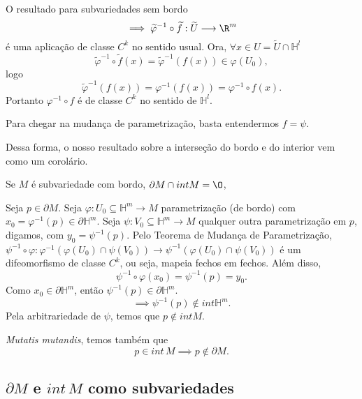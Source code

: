 \begin{demo}
    O resultado para subvariedades sem bordo \[
    \implies \widetilde{\varphi }^{-1} \circ \widetilde{f} : \widetilde{U} \longrightarrow \R^{m}
    \] é uma aplicação de classe $C^{k}$ no sentido usual. Ora, $\forall x\in U = \widetilde{U}\cap \mathbb{H}^{l}$ \[
    \widetilde{\varphi }^{-1} \circ \widetilde{f}\left( x \right)  = \widetilde{\varphi }^{-1}\left( f\left( x \right)  \right) \in \varphi \left( U_0 \right) 
    ,\] logo \[
    \widetilde{\varphi }^{-1}\left( f\left( x \right)  \right) = \varphi ^{-1}\left( f\left( x \right)  \right) = \varphi ^{-1}\circ f \left( x \right) 
    .\] Portanto $\varphi ^{-1}\circ f$ é de classe $C^{k}$ no sentido de $\mathbb{H}^{l}$.
\end{demo}

Para chegar na mudança de parametrização, basta entendermos $f = \psi$.

Dessa forma, o nosso resultado sobre a interseção do bordo e do interior vem como um corolário.

\begin{corollary}
    Se $M$ é subvariedade com bordo, $\partial M \cap int M = \O$,
\end{corollary}

\begin{demo}
    Seja $p \in \partial M$. Seja $\varphi : U_0\subseteq\mathbb{H}^{m} \longrightarrow M$ parametrização (de bordo) com $x_0 = \varphi ^{-1}\left( p \right) \in \partial \mathbb{H}^{m}$. Seja $\psi: V_0\subseteq\mathbb{H}^{m} \longrightarrow M$ qualquer outra parametrização em $p$, digamos, com $y_0 = \psi^{-1}\left( p \right) $. Pelo Teorema de Mudança de Parametrização, $\psi^{-1}\circ \varphi : \varphi ^{-1}\left( \varphi \left( U_0 \right) \cap \psi\left( V_0 \right)  \right)  \longrightarrow \psi^{-1}\left( \varphi \left( U_0 \right) \cap \psi\left( V_0 \right) \right)  $ é um difeomorfismo de classe $C^{k}$, ou seja, mapeia fechos em fechos. Além disso, \[
    \psi^{-1}\circ \varphi \left( x_0 \right) = \psi^{-1}\left( p \right) = y_0
    .\] Como $ x_0 \in \partial \mathbb{H}^{m}$, então $\psi^{-1}\left( p \right) \in \partial \mathbb{H}^{m}$.\[
    \implies \psi ^{-1}\left( p \right) \not\in int \mathbb{H}^{m}
    .\] Pela arbitrariedade de $\psi$, temos que $p \not\in int M$.

    \emph{Mutatis mutandis}, temos também que \[
    p \in int\,M \implies p \not\in \partial M
    .\]
\end{demo}

\subsection*{$\partial M$ e $int\,M$ como subvariedades}

